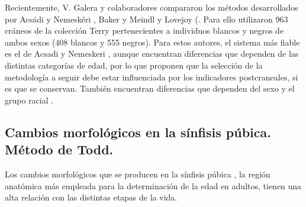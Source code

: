 \documentclass[a4paper,11pt]{article}
\begin{document}
\begin{center}
\end{center}

Recientemente, V. Galera y colaboradores compararon los métodos desarrollados por Acsádi y Nemeskéri \cite{acsadi1970history}, Baker \cite{baker1984relationship} y Meindl y Lovejoy \cite{meindl1985ectocranial}(. Para ello utilizaron 963 cráneos de la colección Terry pertenecientes a individuos blancos y negros de ambos sexos (408 blancos y 555 negros).
Para estos autores, el sistema más fiable es el de Acsadi y Nemeskeri , aunque encuentran diferencias que dependen de las distintas categorías de edad, por lo que proponen que la selección de la metodología a seguir debe estar influenciada por los indicadores postcraneales, si es que se conservan. También encuentran diferencias que dependen del sexo y el grupo racial \cite{galera1998comparison}.
\subsection{Cambios morfológicos en la sínfisis púbica. Método de Todd.}
Los cambios morfológicos que se producen en la sínfisis púbica , la región anatómica más empleada para la determinación de la edad en adultos, tienen una alta relación con las distintas etapas de la vida.
\end{document}
